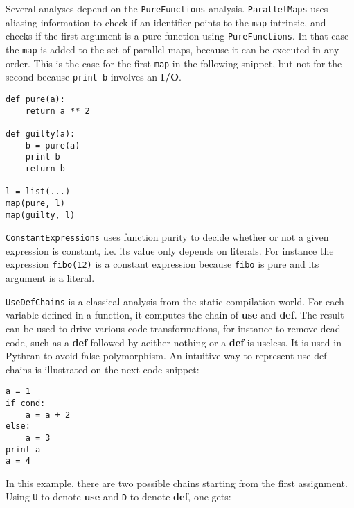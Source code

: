 \documentclass[10pt, onecolumn, preprint]{sigplanconf}
\begin{document}
Several analyses depend on the \texttt{PureFunctions} analysis.
\texttt{ParallelMaps} uses aliasing information to check if an identifier
points to the \texttt{map} intrinsic, and checks if the first argument is a
pure function using \texttt{PureFunctions}. In that case the \texttt{map} is
added to the set of parallel maps, because it can be executed in any order.
This is the case for the first \texttt{map} in the following snippet, but not
for the second because \texttt{print b} involves an \textbf{I/O}.

\begin{lstlisting}
def pure(a):
    return a ** 2

def guilty(a):
    b = pure(a)
    print b
    return b

l = list(...)
map(pure, l)
map(guilty, l)
\end{lstlisting}

\texttt{ConstantExpressions} uses function purity to decide whether or not a given expression
is constant, i.e. its value only depends on literals. For instance the
expression \texttt{fibo(12)} is a constant expression because \texttt{fibo} is pure and its
argument is a literal. 

\texttt{UseDefChains} is a classical analysis from the static compilation world. For
each variable defined in a function, it computes the chain of \textbf{use} and \textbf{def}.
The result can be used to drive various code transformations, for instance to
remove dead code, such as a \textbf{def} followed by aeither nothing or a 
\textbf{def} is useless. 
It is used in Pythran to avoid false polymorphism. An intuitive way to represent
use-def chains is illustrated on the next code snippet:

\begin{lstlisting}
a = 1
if cond:
    a = a + 2
else:
    a = 3
print a
a = 4
\end{lstlisting}

In this example, there are two possible chains starting from the first
assignment. Using \texttt{U} to denote \textbf{use} and \texttt{D} to denote \textbf{def}, one gets:

\begin{center}
\end{center}
\end{document}
